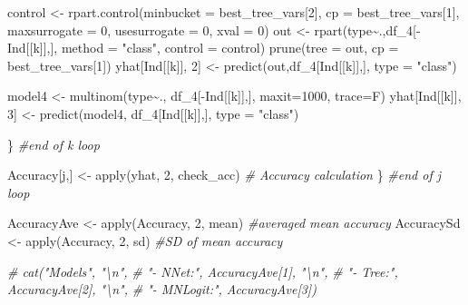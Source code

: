 \documentclass[
]{article}
\newenvironment{Shaded}{\begin{snugshade}}{\end{snugshade}}
\newcommand{\AttributeTok}[1]{\textcolor[rgb]{0.77,0.63,0.00}{#1}}
\newcommand{\CommentTok}[1]{\textcolor[rgb]{0.56,0.35,0.01}{\textit{#1}}}
\newcommand{\DecValTok}[1]{\textcolor[rgb]{0.00,0.00,0.81}{#1}}
\newcommand{\FunctionTok}[1]{\textcolor[rgb]{0.00,0.00,0.00}{#1}}
\newcommand{\NormalTok}[1]{#1}
\newcommand{\OtherTok}[1]{\textcolor[rgb]{0.56,0.35,0.01}{#1}}
\newcommand{\SpecialCharTok}[1]{\textcolor[rgb]{0.00,0.00,0.00}{#1}}
\newcommand{\StringTok}[1]{\textcolor[rgb]{0.31,0.60,0.02}{#1}}
\begin{document}
\begin{Shaded}
\begin{Highlighting}[]
\NormalTok{    control }\OtherTok{\textless{}{-}} \FunctionTok{rpart.control}\NormalTok{(}\AttributeTok{minbucket =}\NormalTok{ best\_tree\_vars[}\DecValTok{2}\NormalTok{], }\AttributeTok{cp =}\NormalTok{ best\_tree\_vars[}\DecValTok{1}\NormalTok{], }\AttributeTok{maxsurrogate =} \DecValTok{0}\NormalTok{, }\AttributeTok{usesurrogate =} \DecValTok{0}\NormalTok{, }\AttributeTok{xval =} \DecValTok{0}\NormalTok{)}
\NormalTok{    out }\OtherTok{\textless{}{-}} \FunctionTok{rpart}\NormalTok{(type}\SpecialCharTok{\textasciitilde{}}\NormalTok{.,df\_4[}\SpecialCharTok{{-}}\NormalTok{Ind[[k]],], }\AttributeTok{method =} \StringTok{"class"}\NormalTok{, }\AttributeTok{control =}\NormalTok{ control)}
    \FunctionTok{prune}\NormalTok{(}\AttributeTok{tree =}\NormalTok{ out, }\AttributeTok{cp =}\NormalTok{ best\_tree\_vars[}\DecValTok{1}\NormalTok{])}
\NormalTok{    yhat[Ind[[k]], }\DecValTok{2}\NormalTok{] }\OtherTok{\textless{}{-}} \FunctionTok{predict}\NormalTok{(out,df\_4[Ind[[k]],], }\AttributeTok{type =} \StringTok{"class"}\NormalTok{)}
    
\NormalTok{    model4 }\OtherTok{\textless{}{-}} \FunctionTok{multinom}\NormalTok{(type}\SpecialCharTok{\textasciitilde{}}\NormalTok{., df\_4[}\SpecialCharTok{{-}}\NormalTok{Ind[[k]],], }\AttributeTok{maxit=}\DecValTok{1000}\NormalTok{, }\AttributeTok{trace=}\NormalTok{F)}
\NormalTok{    yhat[Ind[[k]], }\DecValTok{3}\NormalTok{] }\OtherTok{\textless{}{-}} \FunctionTok{predict}\NormalTok{(model4, df\_4[Ind[[k]],], }\AttributeTok{type =} \StringTok{"class"}\NormalTok{)}
    
\NormalTok{  \} }\CommentTok{\#end of k loop}
  
\NormalTok{  Accuracy[j,] }\OtherTok{\textless{}{-}} \FunctionTok{apply}\NormalTok{(yhat, }\DecValTok{2}\NormalTok{, check\_acc) }\CommentTok{\# Accuracy calculation}
\NormalTok{\} }\CommentTok{\#end of j loop}

\NormalTok{AccuracyAve }\OtherTok{\textless{}{-}} \FunctionTok{apply}\NormalTok{(Accuracy, }\DecValTok{2}\NormalTok{, mean) }\CommentTok{\#averaged mean accuracy}
\NormalTok{AccuracySd }\OtherTok{\textless{}{-}} \FunctionTok{apply}\NormalTok{(Accuracy, }\DecValTok{2}\NormalTok{, sd)  }\CommentTok{\#SD of mean accuracy}

\CommentTok{\# cat("Models", "\textbackslash{}n",}
\CommentTok{\#     "{-} NNet:", AccuracyAve[1], "\textbackslash{}n",}
\CommentTok{\#     "{-} Tree:", AccuracyAve[2], "\textbackslash{}n",}
\CommentTok{\#     "{-} MNLogit:", AccuracyAve[3])}
\end{Highlighting}
\end{Shaded}
\end{document}
